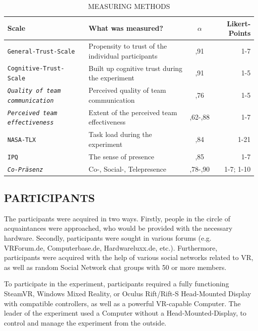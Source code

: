 \documentclass[sigchi]{acmart}
\begin{document}
\begin{table}
  \caption{MEASURING METHODS}
  \label{questionnaires}
  \begin{tabular}{llcr}
    \toprule
    Scale & What was measured? & $\alpha$ & Likert-Points \\
    \midrule
    \texttt{General-Trust-Scale \citep{couch1996assessment}} & Propensity to trust of the individual participants & ,91 & 1-7 \\
    
    \texttt{Cognitive-Trust-Scale \citep{mcallister1995affect}} &Built up cognitive trust during the experiment & ,91 & 1-5\\
    
     \texttt{\textit{Quality of team communication} \citep{gonzalez2014climate}} & Perceived quality of team communication & ,76 & 1-5 \\
     
      \texttt{\textit{Perceived team effectiveness}\citep{gibson2003team}} & Extent of the perceived team effectiveness & ,62-,88 & 1-7\\
          
       \texttt{NASA-TLX\citep{NASATLX}} & Task load during the experiment & ,84 &1-21  \\
       
       \texttt{IPQ \citep{IPQ}} & The sense of presence & ,85 & 1-7 \\
       
        \texttt{\textit{Co-Präsenz} \citep{nowak2003effect}} &  Co-, Social-, Telepresence & ,78-,90 & 1-7; 1-10 \\
    \bottomrule
  \end{tabular}
\end{table}

\subsection{PARTICIPANTS}

The participants were acquired in two ways. Firstly, people in the circle of acquaintances were approached, who would be provided with the necessary hardware. Secondly, participants were sought in various forums (e.g. VRForum.de, Computerbase.de, Hardwareluxx.de, etc.). Furthermore, participants were acquired with the help of various social networks related to VR, as well as random Social Network chat groups with 50 or more members.

To participate in the experiment, participants required a fully functioning SteamVR, Windows Mixed Reality, or Oculus Rift/Rift-S Head-Mounted Display with compatible controllers, as well as a powerful VR-capable Computer. The leader of the experiment used a Computer without a Head-Mounted-Display, to control and manage the experiment from the outside.
\end{document}

